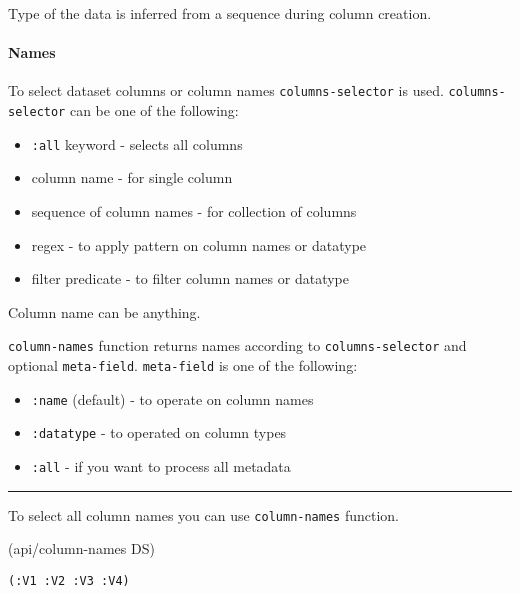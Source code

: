 \documentclass[]{article}
\newenvironment{Shaded}{\begin{snugshade}}{\end{snugshade}}
\newcommand{\NormalTok}[1]{#1}
\providecommand{\tightlist}{%
  \setlength{\itemsep}{0pt}\setlength{\parskip}{0pt}}
\let\oldparagraph\paragraph
\renewcommand{\paragraph}[1]{\oldparagraph{#1}\mbox{}}
\begin{document}
Type of the data is inferred from a sequence during column creation.

\paragraph{Names}\label{names}

To select dataset columns or column names \texttt{columns-selector} is
used. \texttt{columns-selector} can be one of the following:

\begin{itemize}
\tightlist
\item
  \texttt{:all} keyword - selects all columns
\item
  column name - for single column
\item
  sequence of column names - for collection of columns
\item
  regex - to apply pattern on column names or datatype
\item
  filter predicate - to filter column names or datatype
\end{itemize}

Column name can be anything.

\texttt{column-names} function returns names according to
\texttt{columns-selector} and optional \texttt{meta-field}.
\texttt{meta-field} is one of the following:

\begin{itemize}
\tightlist
\item
  \texttt{:name} (default) - to operate on column names
\item
  \texttt{:datatype} - to operated on column types
\item
  \texttt{:all} - if you want to process all metadata
\end{itemize}

\begin{center}\rule{0.5\linewidth}{0.5pt}\end{center}

To select all column names you can use \texttt{column-names} function.

\begin{Shaded}
\begin{Highlighting}[]
\NormalTok{(api/column-names DS)}
\end{Highlighting}
\end{Shaded}

\begin{verbatim}
(:V1 :V2 :V3 :V4)
\end{verbatim}
\end{document}
